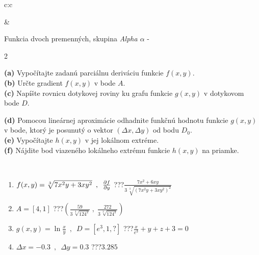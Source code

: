 \documentclass[10pt]{report}
\begin{document}
\begin{tabular}{c:c}
\begin{minipage}[c][104.5mm][t]{0.5\linewidth}
\begin{center}
\end{center}
\end{minipage}
&
\begin{minipage}[c][104.5mm][t]{0.5\linewidth}
\begin{center}
\vspace{7mm}
{\huge \LARGE Funkcia dvoch premenných, skupina \textit{Alpha $\alpha$} -}\\[5mm]
\begin{minipage}{0.95\linewidth}
\begin{center}
{\small \begin{multicols}{2} \raggedright
\textbf{(a)} Vypočítajte zadanú parciálnu deriváciu funkcie \(f(x,y)\). \\[1mm]
\textbf{(b)} Určte gradient \(f(x,y)\) v bode \(A\). \\[1mm]
\textbf{(c)} Napíšte rovnicu dotykovej roviny ku grafu funkcie \(g(x,y)\) v dotykovom bode \(D\). \par \columnbreak
\textbf{(d)} Pomocou lineárnej aproximácie odhadnite funkčnú hodnotu funkcie \(g(x,y)\) v bode, ktorý je posunutý o vektor \((\Delta x, \Delta y)\) od bodu \(D_0\). \\[1mm]
\textbf{(e)} Vypočítajte \(h(x,y)\) v jej lokálnom extréme. \\[1mm]
\textbf{(f)} Nájdite bod viazeného lokálneho extrému funkcie \(h(x,y)\) na priamke. \\[1mm]
\end{multicols}
}
\end{center}
\end{minipage}
\\[4mm]
\begin{minipage}{0.79\linewidth}
\begin{center}
\begin{varwidth}{\linewidth}
\begin{enumerate}
\normalsizerr
\item $f(x,y) = \sqrt[3]{7x^2y + 3xy^2}\enspace , \enspace \pdv{f}{y}$\quad \dotfill\; ???\;\dotfill \quad $\frac{7x^2+6xy}{3\,\sqrt[3]{(7x^2y+3xy^2)^{2}}}$
\item $A = [4, 1]$\quad \dotfill\; ???\;\dotfill \quad $\left( \frac{59}{3\,\sqrt[3]{124^2}} \;,\; \frac{272}{3\,\sqrt[3]{124^2}} \right)$
\item $g(x,y) = \ln\frac{x}{y} \enspace , \enspace D=[e^{3},1,?]$\quad \dotfill\; ???\;\dotfill \quad $\frac{x}{e^3} + y + z + 3 = 0$
\item $\Delta x = {-0.3} \enspace,\enspace \Delta y = {0.3}$\quad \dotfill\; ???\;\dotfill \quad $3.285$

\end{enumerate}
\end{varwidth}
\end{center}
\end{minipage}
\end{center}
\end{minipage}
\end{tabular}
\end{document}
